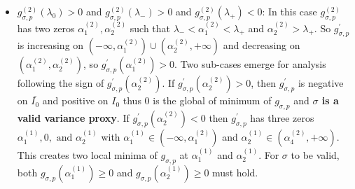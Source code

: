 \documentclass[a4paper, 10pt]{article}
\theoremstyle{definition}
\begin{document}
\begin{itemize}
\begin{itemize}
\begin{enumerate}
        \item If $g_{\sigma, p}^{'}(\alpha_1^{(2)}) > 0$ and $g_{\sigma, p}^{'}(\alpha_2^{(2)}) < 0$, if $g_{\sigma, p}^{'}(\alpha_4^{(2)}) > 0$ then $g_{\sigma, p}^{'}$ has three zeros $\alpha_1^{(1)}, \alpha_2^{(1)}, \text{ and } 0$, creating two local minima at $\alpha_1^{(1)}$ and 0 hence variance proxy is ensured under condition $g_{\sigma, p}(\alpha_1^{(1)}) \geq 0$. If $g_{\sigma, p}^{'}(\alpha_4^{(2)}) \leq 0$ then $g_{\sigma, p}^{'}$ has four zeros $\alpha_1^{(1)}, \alpha_2^{(1)}, 0, \text{ and } \alpha_4^{(1)}$, using the same argument for case $g_{\sigma, p}^{'}(\alpha_4^{(2)}) > 0$ we get three local minima $\alpha_1^{(1)}, 0, \text{ and } \alpha_4^{(1)}$, and the condition to get variance  proxy is that $\min(g_{\sigma, p}(\alpha_1^{(1)}), g_{\sigma, p}(\alpha_4^{(1)})) \geq 0$
        \item If $g_{\sigma, p}^{'}(\alpha_1^{(2)}) < 0$ and $g_{\sigma, p}^{'}(\alpha_2^{(2)}) < 0$.If  $g_{\sigma, p}^{'}(\alpha_4^{(2)}) > 0$ then $g_{\sigma, p}^{'}$ crosses zero once at $\lambda=0$ thus $g_{\sigma, p}$ is increasing on $I_0$ and decreasing on $\bar{I_0}$ thus, like in previous study 0 is a global minimum of $g_{\sigma, p}$  thus \textbf{$\sigma$ is a valid variance proxy}
    \end{enumerate}
    \item  $g_{\sigma, p}^{(2)}(\lambda_0) > 0$ and $g_{\sigma, p}^{(2)}(\lambda_-) > 0$ and $g_{\sigma, p}^{(2)}(\lambda_+) < 0$: In this case $g_{\sigma, p}^{(2)}$ has two zeros $\alpha^{(2)}_1, \alpha^{(2)}_2$ such that $\lambda_- < \alpha^{(2)}_1< \lambda_+$ and  $\alpha^{(2)}_2 > \lambda_+$. So $g_{\sigma, p}^{'}$ is increasing on $(-\infty, \alpha^{(2)}_1) \cup (\alpha^{(2)}_2, +\infty)$ and decreasing on $(\alpha^{(2)}_1, \alpha^{(2)}_2)$, so $g_{\sigma, p}^{'}(\alpha^{(2)}_1)>0$. Two sub-cases emerge for analysis following the sign of $g_{\sigma, p}^{'}(\alpha^{(2)}_2)$. If $g_{\sigma, p}^{'}(\alpha^{(2)}_2)>0$, then $g_{\sigma, p}^{'}$ is negative on $\bar{I_0}$ and positive on $I_0$ thus 0 is the global of minimum of $g_{\sigma, p}$ and \textbf{$\sigma$ is a valid variance proxy}. If $g_{\sigma, p}^{'}(\alpha^{(2)}_2)<0$ then $g_{\sigma, p}^{'}$ has three zeros $\alpha_1^{(1)}, 0, \text{ and } \alpha_2^{(1)}$ with $\alpha_1^{(1)} \in (-\infty, \alpha_1^{(2)})$ and $\alpha_2^{(1)} \in (\alpha_4^{(2)}, +\infty)$. This creates two local minima of $g_{\sigma, p}$ at $\alpha_1^{(1)}$ and $\alpha_2^{(1)}$. For $\sigma$ to be valid, both $g_{\sigma, p}(\alpha_1^{(1)}) \geq 0$ and $g_{\sigma, p}(\alpha_2^{(1)}) \geq 0$ must hold.

\end{itemize}
\end{itemize}
\end{document}
